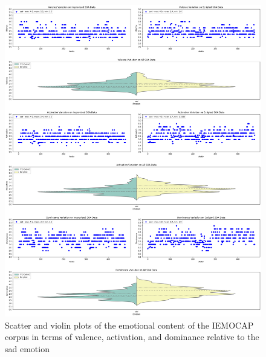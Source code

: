 \begin{figure}[H]
	\centering
	\includegraphics[width=1\linewidth]{figs/appendix/IEMOCAP_data_study/sadScatterViolins.png}
	\caption{Scatter and violin plots of the emotional content of the IEMOCAP corpus in terms of valence, activation, and dominance relative to the sad emotion}
	\label{fig:sadScatterViolins}
\end{figure}


